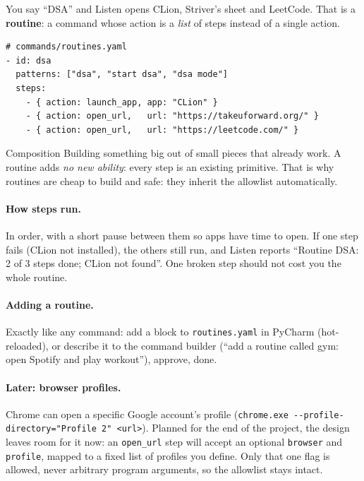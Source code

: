 \documentclass[11pt,a4paper]{article}
\begin{document}
You say ``DSA'' and Listen opens CLion, Striver's sheet and LeetCode. That is a
\textbf{routine}: a command whose action is a \emph{list} of steps instead of a single action.

\begin{lstlisting}
# commands/routines.yaml
- id: dsa
  patterns: ["dsa", "start dsa", "dsa mode"]
  steps:
    - { action: launch_app, app: "CLion" }
    - { action: open_url,   url: "https://takeuforward.org/" }
    - { action: open_url,   url: "https://leetcode.com/" }
\end{lstlisting}

\begin{concept}{Composition}
Building something big out of small pieces that already work. A routine adds \emph{no new
ability}: every step is an existing primitive. That is why routines are cheap to build and
safe: they inherit the allowlist automatically.
\end{concept}

\paragraph{How steps run.} In order, with a short pause between them so apps have time to
open. If one step fails (CLion not installed), the others still run, and Listen reports
``Routine DSA: 2 of 3 steps done; CLion not found''. One broken step should not cost you the
whole routine.

\paragraph{Adding a routine.} Exactly like any command: add a block to
\texttt{routines.yaml} in PyCharm (hot-reloaded), or describe it to the command builder (``add
a routine called gym: open Spotify and play workout''), approve, done.

\paragraph{Later: browser profiles.} Chrome can open a specific Google account's profile
(\texttt{chrome.exe -{}-profile-directory="Profile 2" <url>}). Planned for the end of the
project, the design leaves room for it now: an \texttt{open\_url} step will accept an optional
\texttt{browser} and \texttt{profile}, mapped to a fixed list of profiles you define. Only that
one flag is allowed, never arbitrary program arguments, so the allowlist stays intact.
\end{document}
